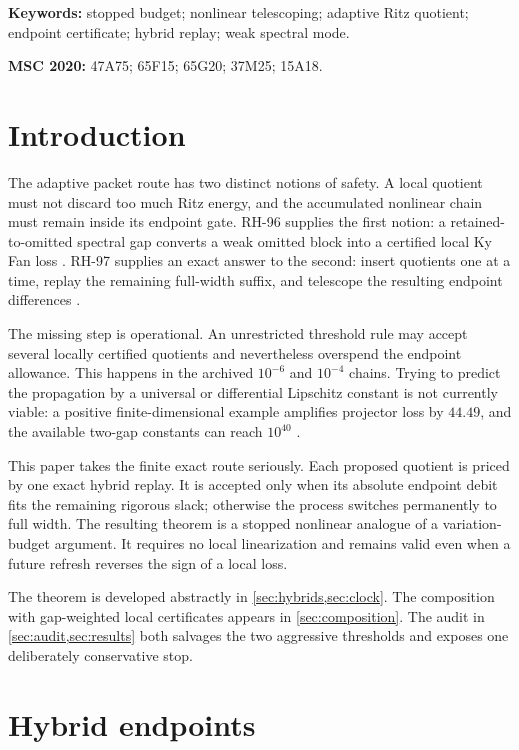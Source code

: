 \documentclass[11pt]{article}
\theoremstyle{definition}
\theoremstyle{remark}
\begin{document}
\noindent\textbf{Keywords:} stopped budget; nonlinear telescoping; adaptive
Ritz quotient; endpoint certificate; hybrid replay; weak spectral mode.

\medskip
\noindent\textbf{MSC 2020:} 47A75; 65F15; 65G20; 37M25; 15A18.

\section{Introduction}

The adaptive packet route has two distinct notions of safety.  A local
quotient must not discard too much Ritz energy, and the accumulated nonlinear
chain must remain inside its endpoint gate.  RH-96 supplies the first notion:
a retained-to-omitted spectral gap converts a weak omitted block into a
certified local Ky Fan loss \citep{WangWeakMode2026}.  RH-97 supplies an exact
answer to the second: insert quotients one at a time, replay the remaining
full-width suffix, and telescope the resulting endpoint differences
\citep{WangHybridBudget2026}.

The missing step is operational.  An unrestricted threshold rule may accept
several locally certified quotients and nevertheless overspend the endpoint
allowance.  This happens in the archived $10^{-6}$ and $10^{-4}$ chains.
Trying to predict the propagation by a universal or differential Lipschitz
constant is not currently viable: a positive finite-dimensional example
amplifies projector loss by $44.49$, and the available two-gap constants can
reach $10^{40}$ \citep{WangProjectorBarrier2026,WangTwoGap2026}.

This paper takes the finite exact route seriously.  Each proposed quotient is
priced by one exact hybrid replay.  It is accepted only when its absolute
endpoint debit fits the remaining rigorous slack; otherwise the process
switches permanently to full width.  The resulting theorem is a stopped
nonlinear analogue of a variation-budget argument.  It requires no local
linearization and remains valid even when a future refresh reverses the sign
of a local loss.

The theorem is developed abstractly in \cref{sec:hybrids,sec:clock}.  The
composition with gap-weighted local certificates appears in
\cref{sec:composition}.  The audit in \cref{sec:audit,sec:results} both
salvages the two aggressive thresholds and exposes one deliberately
conservative stop.

\section{Hybrid endpoints}
\label{sec:hybrids}
\end{document}
